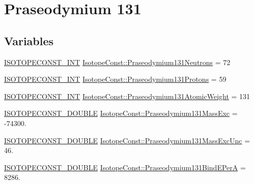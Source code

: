 \hypertarget{group___isotope_const-_praseodymium-_pr131}{}\section{Praseodymium 131}
\label{group___isotope_const-_praseodymium-_pr131}
\subsection*{Variables}
\begin{DoxyCompactItemize}
\item 
\mbox{\hyperlink{group___isotope_const-_macros_ga5f18360b3e99483a35c32d789e62621c}{I\+S\+O\+T\+O\+P\+E\+C\+O\+N\+S\+T\+\_\+\+I\+NT}} \mbox{\hyperlink{group___isotope_const-_praseodymium-_pr131_ga6092ba79c13995ca1e0dd3c82106bf5a}{Isotope\+Const\+::\+Praseodymium131\+Neutrons}} = 72
\item 
\mbox{\hyperlink{group___isotope_const-_macros_ga5f18360b3e99483a35c32d789e62621c}{I\+S\+O\+T\+O\+P\+E\+C\+O\+N\+S\+T\+\_\+\+I\+NT}} \mbox{\hyperlink{group___isotope_const-_praseodymium-_pr131_ga0e26e55b53c10d6392efb8b0716564af}{Isotope\+Const\+::\+Praseodymium131\+Protons}} = 59
\item 
\mbox{\hyperlink{group___isotope_const-_macros_ga5f18360b3e99483a35c32d789e62621c}{I\+S\+O\+T\+O\+P\+E\+C\+O\+N\+S\+T\+\_\+\+I\+NT}} \mbox{\hyperlink{group___isotope_const-_praseodymium-_pr131_ga0502111b8aca86ffcb4beb528d1a1bec}{Isotope\+Const\+::\+Praseodymium131\+Atomic\+Weight}} = 131
\item 
\mbox{\hyperlink{group___isotope_const-_macros_ga8f45a7272ce02c0b4c65c44636ed719a}{I\+S\+O\+T\+O\+P\+E\+C\+O\+N\+S\+T\+\_\+\+D\+O\+U\+B\+LE}} \mbox{\hyperlink{group___isotope_const-_praseodymium-_pr131_gadf74e7691fa3a45da38bfb4160fc1e4c}{Isotope\+Const\+::\+Praseodymium131\+Mass\+Exc}} = -\/74300.
\item 
\mbox{\hyperlink{group___isotope_const-_macros_ga8f45a7272ce02c0b4c65c44636ed719a}{I\+S\+O\+T\+O\+P\+E\+C\+O\+N\+S\+T\+\_\+\+D\+O\+U\+B\+LE}} \mbox{\hyperlink{group___isotope_const-_praseodymium-_pr131_ga6ef71867a868b7389ec48f3206240483}{Isotope\+Const\+::\+Praseodymium131\+Mass\+Exc\+Unc}} = 46.
\item 
\mbox{\hyperlink{group___isotope_const-_macros_ga8f45a7272ce02c0b4c65c44636ed719a}{I\+S\+O\+T\+O\+P\+E\+C\+O\+N\+S\+T\+\_\+\+D\+O\+U\+B\+LE}} \mbox{\hyperlink{group___isotope_const-_praseodymium-_pr131_ga57380cfedbae54711d9069f3d8cf3866}{Isotope\+Const\+::\+Praseodymium131\+Bind\+E\+PerA}} = 8286.

\end{DoxyCompactItemize}
